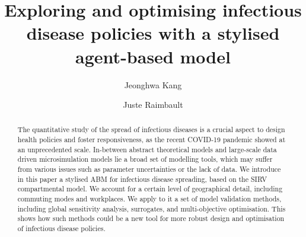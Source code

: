 \documentclass[smallextended]{svjour3}       %
\begin{document}
\title{Exploring and optimising infectious disease policies with a stylised agent-based model}


\author{Jeonghwa Kang          \and
        Juste Raimbault
}





\maketitle

\begin{abstract}
The quantitative study of the spread of infectious diseases is a crucial aspect to design health policies and foster responsiveness, as the recent COVID-19 pandemic showed at an unprecedented scale. In-between abstract theoretical models and large-scale data driven microsimulation models lie a broad set of modelling tools, which may suffer from various issues such as parameter uncertainties or the lack of data. We introduce in this paper a stylised ABM for infectious disease spreading, based on the SIRV compartmental model. We account for a certain level of geographical detail, including commuting modes and workplaces. We apply to it a set of model validation methods, including global sensitivity analysis, surrogates, and multi-objective optimisation. This shows how such methods could be a new tool for more robust design and optimisation of infectious disease policies.
\end{abstract}

\end{document}
